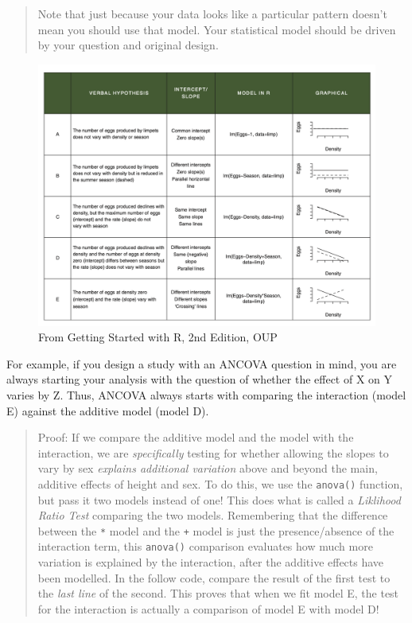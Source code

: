 \documentclass[
]{book}
\begin{document}
\begin{quote}
Note that just because your data looks like a particular pattern doesn't mean you should use that model. Your statistical model should be driven by your question and original design.
\end{quote}

\begin{figure}
\includegraphics[width=20.56in]{images/GSwithR_Grid} \caption{From Getting Started with R, 2nd Edition, OUP}\label{fig:unnamed-chunk-49}
\end{figure}

For example, if you design a study with an ANCOVA question in mind, you are always starting your analysis with the question of whether the effect of X on Y varies by Z. Thus, ANCOVA always starts with comparing the interaction (model E) against the additive model (model D).

\begin{quote}
Proof: If we compare the additive model and the model with the interaction, we are \emph{specifically} testing for whether allowing the slopes to vary by sex \emph{explains additional variation} above and beyond the main, additive effects of height and sex. To do this, we use the \texttt{anova()} function, but pass it two models instead of one! This does what is called a \emph{Liklihood Ratio Test} comparing the two models. Remembering that the difference between the \texttt{*} model and the \texttt{+} model is just the presence/absence of the interaction term, this \texttt{anova()} comparison evaluates how much more variation is explained by the interaction, after the additive effects have been modelled. In the follow code, compare the result of the first test to the \emph{last line} of the second. This proves that when we fit model E, the test for the interaction is actually a comparison of model E with model D!
\end{quote}
\end{document}
